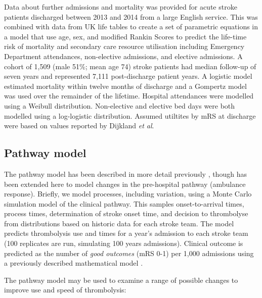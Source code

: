 Data about further admissions and mortality was provided for acute stroke patients discharged between 2013 and 2014 from a large English service.  This was combined with data from UK life tables to create a set of parametric equations in a model that use age, sex, and modified Rankin Scores to predict the life-time risk of mortality and secondary care resource utilisation including Emergency Department attendances, non-elective admissions, and elective admissions. A cohort of 1,509 (male 51\%; mean age 74) stroke patients had median follow-up of seven years and represented 7,111 post-discharge patient years.  A logistic model estimated mortality within twelve months of discharge and a Gompertz model was used over the remainder of the lifetime. Hospital attendances were modelled using a Weibull distribution. Non-elective and elective bed days were both modelled using a log-logistic distribution. Assumed utiltites by mRS at discharge were based on values reported by Dijkland \textit{et al}. %

\subsection{Pathway model}

The pathway model has been described in more detail previously \cite{allen_use_2022}, though has been extended here to model changes in the pre-hospital pathway (ambulance response). Briefly, we model processes, including variation, using a Monte Carlo simulation model of the clinical pathway. This samples onset-to-arrival times, process times, determination of stroke onset time, and decision to thrombolyse from distributions based on historic data for each stroke team. The model predicts thrombolysis use and times for a year's admission to each stroke team (100 replicates are run, simulating 100 years admissions). Clinical outcome is predicted as the number of \textit{good outcomes} (mRS 0-1) per 1,000 admissions using a previously described mathematical model \cite{allen_estimation_2020}.

The pathway model may be used to examine a range of possible changes to improve use and speed of thrombolysis:

